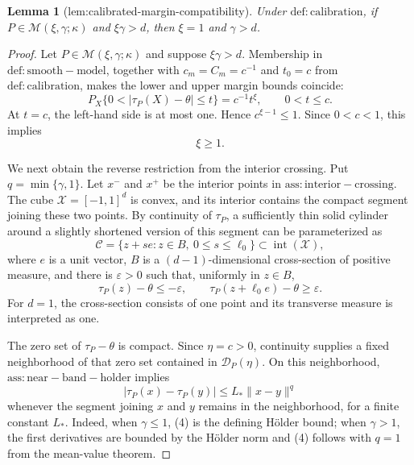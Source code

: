 \documentclass{article}
\newtheorem{lemma}{Lemma}
\begin{document}
\begin{lemma}[lem:calibrated-margin-compatibility]\label{lem:calibrated-margin-compatibility}
Under \(\mathrm{def:calibration}\), if \(P\in\mathcal M(\xi,\gamma;\kappa)\) and \(\xi\gamma>d\), then \(\xi=1\) and \(\gamma>d\).
\end{lemma}
\begin{proof}
Let \(P\in\mathcal M(\xi,\gamma;\kappa)\) and suppose \(\xi\gamma>d\). Membership in \(\mathrm{def:smooth-model}\), together with \(c_m=C_m=c^{-1}\) and \(t_0=c\) from \(\mathrm{def:calibration}\), makes the lower and upper margin bounds coincide:
\[
P_X\{0<|\tau_P(X)-\theta|\le t\}=c^{-1}t^\xi,
\qquad 0<t\le c.
\tag{1}
\]
At \(t=c\), the left-hand side is at most one. Hence \(c^{\xi-1}\le1\). Since \(0<c<1\), this implies
\[
\xi\ge1.
\tag{2}
\]

We next obtain the reverse restriction from the interior crossing. Put \(q=\min\{\gamma,1\}\). Let \(x^-\) and \(x^+\) be the interior points in \(\mathrm{ass:interior-crossing}\). The cube \(\mathcal X=[-1,1]^d\) is convex, and its interior contains the compact segment joining these two points. By continuity of \(\tau_P\), a sufficiently thin solid cylinder around a slightly shortened version of this segment can be parameterized as
\[
\mathcal C=\{z+se:z\in B,\ 0\le s\le \ell_0\}\subset\operatorname{int}(\mathcal X),
\]
where \(e\) is a unit vector, \(B\) is a \((d-1)\)-dimensional cross-section of positive measure, and there is \(\varepsilon>0\) such that, uniformly in \(z\in B\),
\[
\tau_P(z)-\theta\le-\varepsilon,
\qquad
\tau_P(z+\ell_0e)-\theta\ge\varepsilon.
\tag{3}
\]
For \(d=1\), the cross-section consists of one point and its transverse measure is interpreted as one.

The zero set of \(\tau_P-\theta\) is compact. Since \(\eta=c>0\), continuity supplies a fixed neighborhood of that zero set contained in \(\mathcal D_P(\eta)\). On this neighborhood, \(\mathrm{ass:near-band-holder}\) implies
\[
|\tau_P(x)-\tau_P(y)|\le L_*\|x-y\|^q
\tag{4}
\]
whenever the segment joining \(x\) and \(y\) remains in the neighborhood, for a finite constant \(L_*\). Indeed, when \(\gamma\le1\), (4) is the defining Hölder bound; when \(\gamma>1\), the first derivatives are bounded by the Hölder norm and (4) follows with \(q=1\) from the mean-value theorem.


\end{proof}
\end{document}
